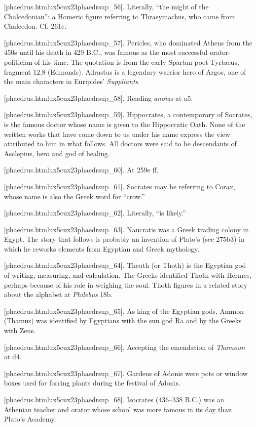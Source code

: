 [phaedrus.htmlux5cux23phaedrsup_56]. Literally, “the might of
the Chalcedonian”: a Homeric figure referring to Thrasymachus, who came
from Chalcedon. Cf. 261c.

[phaedrus.htmlux5cux23phaedrsup_57]. Pericles, who dominated
Athens from the 450s until his death in 429 B.C., was famous as the most
successful orator-politician of his time. The quotation is from the
early Spartan poet Tyrtaeus, fragment 12.8 (Edmonds). Adrastus is a
legendary warrior hero of Argos, one of the main characters in
Euripides' {\em Suppliants}.

[phaedrus.htmlux5cux23phaedrsup_58]. Reading {\em anoias} at
a5.

[phaedrus.htmlux5cux23phaedrsup_59]. Hippocrates, a
contemporary of Socrates, is the famous doctor whose name is given to
the Hippocratic Oath. None of the written works that have come down to
us under his name express the view attributed to him in what follows.
All doctors were said to be descendants of Asclepius, hero and god of
healing.

[phaedrus.htmlux5cux23phaedrsup_60]. At 259e ff.

[phaedrus.htmlux5cux23phaedrsup_61]. Socrates may be referring
to Corax, whose name is also the Greek word for “crow.”

[phaedrus.htmlux5cux23phaedrsup_62]. Literally, “is likely.”

[phaedrus.htmlux5cux23phaedrsup_63]. Naucratis was a Greek
trading colony in Egypt. The story that follows is probably an invention
of Plato's (see 275b3) in which he reworks elements from Egyptian and
Greek mythology.

[phaedrus.htmlux5cux23phaedrsup_64]. Theuth (or Thoth) is the
Egyptian god of writing, measuring, and calculation. The Greeks
identified Thoth with Hermes, perhaps because of his role in weighing
the soul. Thoth figures in a related story about the alphabet at
{\em Philebus} 18b.

[phaedrus.htmlux5cux23phaedrsup_65]. As king of the Egyptian
gods, Ammon (Thamus) was identified by Egyptians with the sun god Ra and
by the Greeks with Zeus.

[phaedrus.htmlux5cux23phaedrsup_66]. Accepting the emendation
of {\em Thamoun} at d4.

[phaedrus.htmlux5cux23phaedrsup_67]. Gardens of Adonis were
pots or window boxes used for forcing plants during the festival of
Adonis.

[phaedrus.htmlux5cux23phaedrsup_68]. Isocrates (436--338 B.C.)
was an Athenian teacher and orator whose school was more famous in its
day than Plato's Academy.
